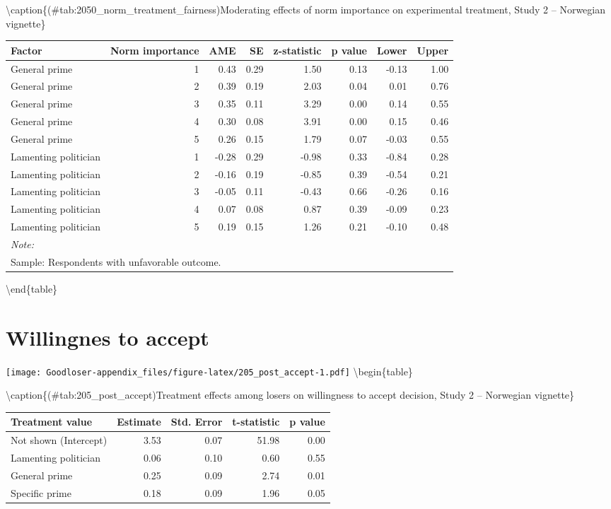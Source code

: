 \documentclass[
]{book}
\begin{document}
\textbackslash caption\{(\#tab:2050\_norm\_treatment\_fairness)Moderating effects of norm importance on experimental treatment, Study 2 -- Norwegian vignette\}
\centering

\begin{tabular}[t]{lrrrrrrr}
\toprule
Factor & Norm importance & AME & SE & z-statistic & p value & Lower & Upper\\
\midrule
General prime & 1 & 0.43 & 0.29 & 1.50 & 0.13 & -0.13 & 1.00\\
General prime & 2 & 0.39 & 0.19 & 2.03 & 0.04 & 0.01 & 0.76\\
General prime & 3 & 0.35 & 0.11 & 3.29 & 0.00 & 0.14 & 0.55\\
General prime & 4 & 0.30 & 0.08 & 3.91 & 0.00 & 0.15 & 0.46\\
General prime & 5 & 0.26 & 0.15 & 1.79 & 0.07 & -0.03 & 0.55\\
\addlinespace
Lamenting politician & 1 & -0.28 & 0.29 & -0.98 & 0.33 & -0.84 & 0.28\\
Lamenting politician & 2 & -0.16 & 0.19 & -0.85 & 0.39 & -0.54 & 0.21\\
Lamenting politician & 3 & -0.05 & 0.11 & -0.43 & 0.66 & -0.26 & 0.16\\
Lamenting politician & 4 & 0.07 & 0.08 & 0.87 & 0.39 & -0.09 & 0.23\\
Lamenting politician & 5 & 0.19 & 0.15 & 1.26 & 0.21 & -0.10 & 0.48\\
\bottomrule
\multicolumn{8}{l}{\textit{Note: }}\\
\multicolumn{8}{l}{Sample: Respondents with unfavorable outcome.}\\
\end{tabular}

\textbackslash end\{table\}

\hypertarget{willingnes-to-accept-3}{%
\section{Willingnes to accept}\label{willingnes-to-accept-3}}

\texttt{[image: Goodloser-appendix\_files/figure-latex/205\_post\_accept-1.pdf]} \textbackslash begin\{table\}

\textbackslash caption\{(\#tab:205\_post\_accept)Treatment effects among losers on willingness to accept decision, Study 2 -- Norwegian vignette\}
\centering

\begin{tabular}[t]{lrrrr}
\toprule
Treatment value & Estimate & Std. Error & t-statistic & p value\\
\midrule
Not shown (Intercept) & 3.53 & 0.07 & 51.98 & 0.00\\
Lamenting politician & 0.06 & 0.10 & 0.60 & 0.55\\
General prime & 0.25 & 0.09 & 2.74 & 0.01\\
Specific prime & 0.18 & 0.09 & 1.96 & 0.05\\
\bottomrule
\end{tabular}
\end{document}
